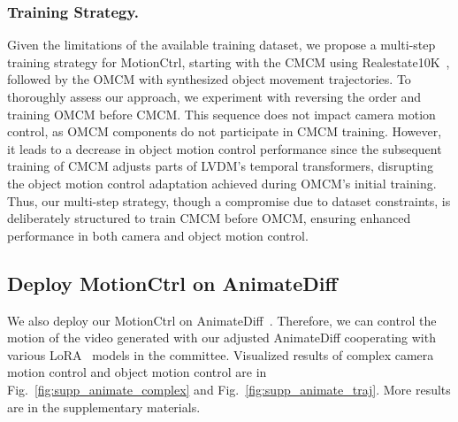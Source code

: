 \documentclass[sigconf]{acmart}
\begin{document}
\begin{table}
  \renewcommand{\arraystretch}{1.2}
  \centering
  \caption{\textbf{Ablation of Object Motion Control}. The Object Motion Control Module (OMCM), when initially trained on dense object movement trajectories and subsequently fine-tuned with sparse trajectories, outperforms versions trained exclusively on either dense or sparse trajectories.}
  \vspace{-0.4cm}
  \vspace{-15pt}
  \label{tab:object_motion}
\end{table}


\subsubsection{Training Strategy.} 
Given the limitations of the available training dataset, we propose a multi-step training strategy for MotionCtrl, starting with the CMCM using Realestate10K~\cite{zhou2018stereo}, followed by the OMCM with synthesized object movement trajectories. To thoroughly assess our approach, we experiment with reversing the order and training OMCM before CMCM. This sequence does not impact camera motion control, as OMCM components do not participate in CMCM training. However, it leads to a decrease in object motion control performance since the subsequent training of CMCM adjusts parts of LVDM's temporal transformers, disrupting the object motion control adaptation achieved during OMCM's initial training. Thus, our multi-step strategy, though a compromise due to dataset constraints, is deliberately structured to train CMCM before OMCM, ensuring enhanced performance in both camera and object motion control.

\subsection{Deploy MotionCtrl on AnimateDiff}
We also deploy our MotionCtrl on AnimateDiff~\cite{guo2023animatediff}. Therefore, we can control the motion of the video generated with our adjusted AnimateDiff cooperating with various LoRA~\cite{lora} models in the committee. Visualized results of complex camera motion control and object motion control are in Fig.~\ref{fig:supp_animate_complex} and Fig.~\ref{fig:supp_animate_traj}. More results are in the supplementary materials.
\end{document}
